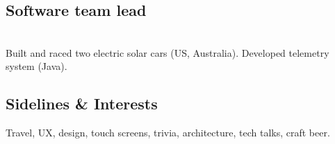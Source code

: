 \documentclass[]{cvpn}
\begin{document}
\begin{multicols}{2}
\subsection{Software team lead}
\\
Built and raced two electric solar cars (US, Australia).
Developed telemetry system (Java).\\


\subsection{Sidelines \& Interests}
Travel, UX, design, touch screens,
trivia, architecture, tech talks, craft beer.

\end{multicols}
\end{document}
